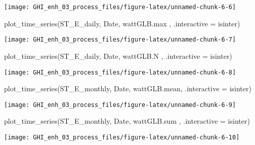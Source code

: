 \documentclass[
  10pt,
  a4paper,oneside]{article}
\newenvironment{Shaded}{\begin{snugshade}}{\end{snugshade}}
\newcommand{\AttributeTok}[1]{\textcolor[rgb]{0.77,0.63,0.00}{#1}}
\newcommand{\FunctionTok}[1]{\textcolor[rgb]{0.00,0.00,0.00}{#1}}
\newcommand{\NormalTok}[1]{#1}
\begin{document}
\begin{center}\texttt{[image: GHI\_enh\_03\_process\_files/figure-latex/unnamed-chunk-6-6]} \end{center}

\begin{Shaded}
\begin{Highlighting}[]
\FunctionTok{plot\_time\_series}\NormalTok{(ST\_E\_daily, Date, wattGLB.max , }\AttributeTok{.interactive =}\NormalTok{ isinter)}
\end{Highlighting}
\end{Shaded}

\begin{center}\texttt{[image: GHI\_enh\_03\_process\_files/figure-latex/unnamed-chunk-6-7]} \end{center}

\begin{Shaded}
\begin{Highlighting}[]
\FunctionTok{plot\_time\_series}\NormalTok{(ST\_E\_daily, Date, wattGLB.N   , }\AttributeTok{.interactive =}\NormalTok{ isinter)}
\end{Highlighting}
\end{Shaded}

\begin{center}\texttt{[image: GHI\_enh\_03\_process\_files/figure-latex/unnamed-chunk-6-8]} \end{center}

\begin{Shaded}
\begin{Highlighting}[]
\FunctionTok{plot\_time\_series}\NormalTok{(ST\_E\_monthly, Date, wattGLB.mean, }\AttributeTok{.interactive =}\NormalTok{ isinter)}
\end{Highlighting}
\end{Shaded}

\begin{center}\texttt{[image: GHI\_enh\_03\_process\_files/figure-latex/unnamed-chunk-6-9]} \end{center}

\begin{Shaded}
\begin{Highlighting}[]
\FunctionTok{plot\_time\_series}\NormalTok{(ST\_E\_monthly, Date, wattGLB.sum , }\AttributeTok{.interactive =}\NormalTok{ isinter)}
\end{Highlighting}
\end{Shaded}

\begin{center}\texttt{[image: GHI\_enh\_03\_process\_files/figure-latex/unnamed-chunk-6-10]} \end{center}
\end{document}
